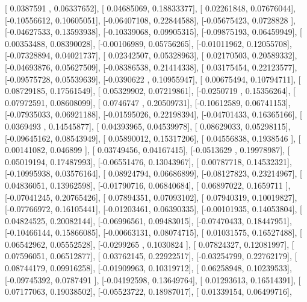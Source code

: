 \documentclass{article}
\begin{document}
       [ 0.0387591 ,  0.06337652],
       [ 0.04685069,  0.18833377],
       [ 0.02261848,  0.07676044],
       [-0.10556612,  0.10605051],
       [-0.06407108,  0.22844588],
       [-0.05675423,  0.0728828 ],
       [-0.04627533,  0.13593938],
       [-0.10339068,  0.09905315],
       [-0.09875193,  0.06459949],
       [ 0.00353488,  0.08390028],
       [-0.00106989,  0.05756265],
       [-0.01011962,  0.12055708],
       [-0.07328894,  0.04021737],
       [ 0.02342507,  0.05328963],
       [ 0.02170503,  0.20589332],
       [-0.04693876,  0.05627509],
       [-0.08386538,  0.21414338],
       [ 0.03175454,  0.22123577],
       [-0.09575728,  0.05539639],
       [-0.0390622 ,  0.10955947],
       [ 0.00675494,  0.10794711],
       [ 0.08729185,  0.17561549],
       [ 0.05329902,  0.07219861],
       [-0.0250719 ,  0.15356264],
       [ 0.07972591,  0.08608099],
       [ 0.0746747 ,  0.20509731],
       [-0.10612589,  0.06741153],
       [-0.07935033,  0.06921188],
       [-0.01595026,  0.22198394],
       [-0.04701433,  0.16365166],
       [ 0.0369493 ,  0.14545877],
       [ 0.04393965,  0.04539978],
       [ 0.08629033,  0.05298115],
       [-0.09645162,  0.08543949],
       [ 0.05890012,  0.15317206],
       [ 0.04556838,  0.1938546 ],
       [ 0.00141082,  0.046899  ],
       [ 0.03749456,  0.04167415],
       [-0.0513629 ,  0.19978987],
       [ 0.05019194,  0.17487993],
       [-0.06551476,  0.13043967],
       [ 0.00787718,  0.14532321],
       [-0.10995938,  0.03576164],
       [ 0.08924794,  0.06686899],
       [-0.08127823,  0.23214967],
       [ 0.04836051,  0.13962598],
       [-0.01790716,  0.06840684],
       [ 0.06897022,  0.1659711 ],
       [-0.07041245,  0.20765426],
       [ 0.07894351,  0.07093102],
       [ 0.07940319,  0.10019827],
       [-0.07766972,  0.16105441],
       [-0.01203461,  0.06390335],
       [-0.00101935,  0.14053804],
       [ 0.04824525,  0.20082144],
       [-0.06996561,  0.09483015],
       [-0.07470433,  0.18447951],
       [-0.10466144,  0.15866085],
       [-0.00663131,  0.08074715],
       [ 0.01031575,  0.16527488],
       [ 0.06542962,  0.05552528],
       [-0.0299265 ,  0.1030824 ],
       [ 0.07824327,  0.12081997],
       [ 0.07596051,  0.06512877],
       [ 0.03762145,  0.22922517],
       [-0.03254799,  0.22762179],
       [ 0.08744179,  0.09916258],
       [-0.01909963,  0.10319712],
       [ 0.06258948,  0.10239533],
       [-0.09745392,  0.0787491 ],
       [-0.04192598,  0.13649764],
       [ 0.01293613,  0.16514391],
       [ 0.07177063,  0.19038502],
       [-0.05523722,  0.18987017],
       [ 0.01339154,  0.06499716],
\end{document}
